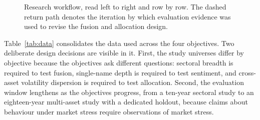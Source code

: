 \begin{figure}[!htb]
{}
\caption[Research workflow]{Research workflow, read left to right and row by row. The
dashed return path denotes the iteration by which evaluation evidence was used to revise
the fusion and allocation design.}
\label{fig:workflow}
\end{figure}

Table~\ref{tab:data} consolidates the data used across the four objectives. Two
deliberate design decisions are visible in it. First, the study universes differ by
objective because the objectives ask different questions: sectoral breadth is required to
test fusion, single-name depth is required to test sentiment, and cross-asset volatility
dispersion is required to test allocation. Second, the evaluation window lengthens as the
objectives progress, from a ten-year sectoral study to an eighteen-year multi-asset study
with a dedicated holdout, because claims about behaviour under market stress require
observations of market stress.

